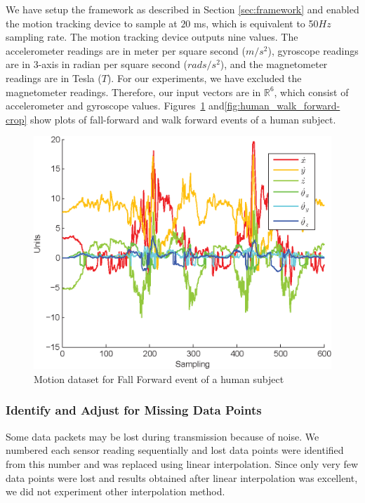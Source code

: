 \documentclass{IEEEtran}
\begin{document}
We have setup the framework as described in Section \ref{sec:framework} and enabled the 
motion tracking device to sample at $20$ ms, which is equivalent to 50$Hz$ 
sampling rate. The motion tracking device outputs nine values. The  
accelerometer readings are in  meter per square second ($m/s^2$), gyroscope readings are 
in 3-axis in radian per square second ($rads/s^2$), and the magnetometer readings are  in 
Tesla ($T$). For our experiments, we have excluded the magnetometer readings. Therefore, 
our input vectors are in $\mathbb{R}^6$, which consist of accelerometer and gyroscope 
values. Figures~\ref{fig:human_fall_forward_crop} and\ref{fig:human_walk_forward-crop} show plots of fall-forward and walk forward events of a human subject.
\begin{figure}[htb]
	\centering
		\includegraphics[width=0.95\columnwidth]{plots/human_falling-crop.eps}
	\caption{Motion dataset for  Fall Forward event of a human subject}
	\label{fig:human_fall_forward_crop}
\end{figure}


\subsubsection{Identify and Adjust for Missing Data Points}
\label{sec:IdentifyAndAdjustForMissingDataPoints}
Some data packets may be lost during transmission because of noise. We numbered each 
sensor reading sequentially and lost data points were identified from this number and was 
replaced using linear interpolation. Since only very few data points were lost and 
results obtained after linear interpolation was excellent, we did not experiment other 
interpolation method.
\end{document}
